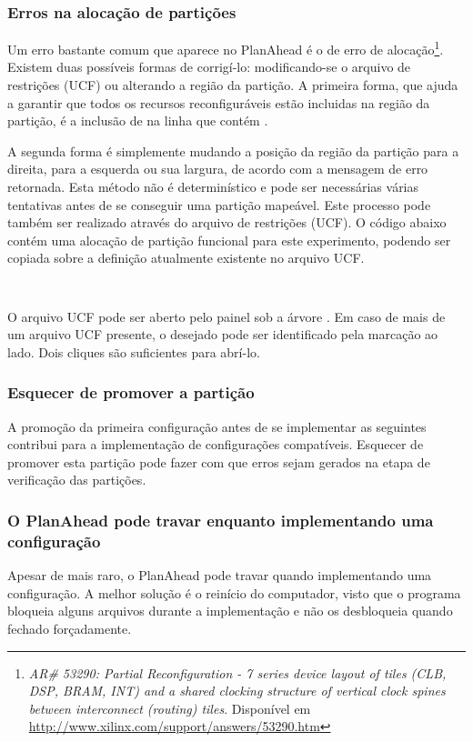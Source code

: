\documentclass[11pt,a4paper,oneside]{book}
\begin{document}
\subsubsection{Erros na alocação de partições}
\label{par:alocacao}
Um erro bastante comum que aparece no PlanAhead é o de erro de alocação\footnote{\textit{AR\# 53290: Partial Reconfiguration - 7 series device layout of tiles (CLB, DSP, BRAM, INT) and a shared clocking structure of vertical clock spines between interconnect (routing) tiles}. Disponível em \url{http://www.xilinx.com/support/answers/53290.htm}}.
Existem duas possíveis formas de corrigí-lo: modificando-se o arquivo de restrições (UCF) ou alterando a região da partição.
A primeira forma, que ajuda a garantir que todos os recursos reconfiguráveis estão incluidas na região da partição, é a inclusão de  na linha que contém .

A segunda forma é simplemente mudando a posição da região da partição para a direita, para a esquerda ou sua largura, de acordo com a mensagem de erro retornada.
Esta método não é determinístico e pode ser necessárias várias tentativas antes de se conseguir uma partição mapeável. 
Este processo pode também ser realizado através do arquivo de restrições (UCF).
O código abaixo contém uma alocação de partição funcional para este experimento, podendo ser copiada sobre a definição atualmente existente no arquivo UCF.
\begin{lstlisting}
				
\end{lstlisting}

O arquivo UCF pode ser aberto pelo painel  sob a árvore .
Em caso de mais de um arquivo UCF presente, o desejado pode ser identificado pela marcação  ao lado.
Dois cliques são suficientes para abrí-lo. 

\subsubsection{Esquecer de promover a partição}
A promoção da primeira configuração antes de se implementar as seguintes contribui para a implementação de configurações compatíveis.
Esquecer de promover esta partição pode fazer com que erros sejam gerados na etapa de verificação das partições.

\subsubsection{O PlanAhead pode travar enquanto implementando uma configuração}
Apesar de mais raro, o PlanAhead pode travar quando implementando uma configuração.
A melhor solução é o reinício do computador, visto que o programa bloqueia alguns arquivos durante a implementação e não os desbloqueia quando fechado forçadamente.
\end{document}
